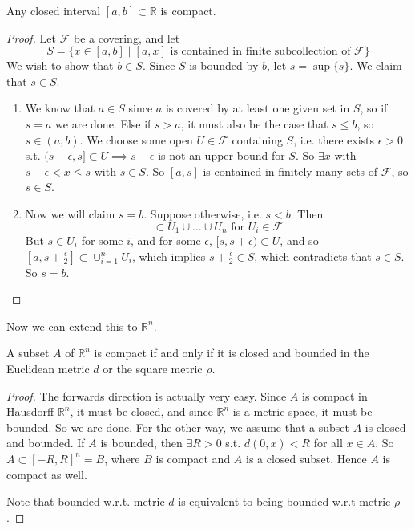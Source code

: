   \begin{lemma}
    Any closed interval $[a, b] \subset \mathbb{R}$ is compact. 
  \end{lemma} 
  \begin{proof}
    Let $\mathcal{F}$ be a covering, and let 
    \begin{equation}
      S = \{x \in [a, b] \mid [a, x] \text{ is contained in finite subcollection of } \mathcal{F} \}
    \end{equation}
    We wish to show that $b \in S$. Since $S$ is bounded by $b$, let $s = \sup\{s\}$. We claim that $s \in S$. 
    \begin{enumerate}
      \item We know that $a \in S$ since $a$ is covered by at least one given set in $S$, so if $s = a$ we are done. Else if $s > a$, it must also be the case that $s \leq b$, so $s \in (a, b)$. We choose some open $U \in \mathcal{F}$ containing $S$, i.e. there exists $\epsilon > 0$ s.t. $(s - \epsilon, s] \subset U \implies s - \epsilon$ is not an upper bound for $S$. So $\exists x$ with $s - \epsilon < x \leq s$ with $s \in S$. So $[a, s]$ is contained in finitely many sets of $\mathcal{F}$, so $s \in S$. 

      \item Now we will claim $s = b$. Suppose otherwise, i.e. $s < b$. Then 
      \begin{equation}
        [a, s] \subset U_1 \cup \ldots \cup U_n \text{ for } U_i \in \mathcal{F}
      \end{equation}
      But $s \in U_i$ for some $i$, and for some $\epsilon$, $[s, s + \epsilon) \subset U$, and so $[a, s + \frac{\epsilon}{2}] \subset \cup_{i=1}^{n} U_i$, which implies $s + \frac{\epsilon}{2} \in S$, which contradicts that $s \in S$. So $s = b$. 
    \end{enumerate}
  \end{proof}

  Now we can extend this to $\mathbb{R}^n$. 

  \begin{theorem}
    A subset $A$ of $\mathbb{R}^n$ is compact if and only if it is closed and bounded in the Euclidean metric $d$ or the square metric $\rho$. 
  \end{theorem}
  \begin{proof}
    The forwards direction is actually very easy. Since $A$ is compact in Hausdorff $\mathbb{R}^n$, it must be closed, and since $\mathbb{R}^n$ is a metric space, it must be bounded. So we are done. For the other way, we assume that a subset $A$ is closed and bounded. If $A$ is bounded, then $\exists R > 0$ s.t. $d(0, x) < R$ for all $x \in A$. So $A \subset [-R, R]^n = B$, where $B$ is compact and $A$ is a closed subset. Hence $A$ is compact as well. 

    Note that bounded w.r.t. metric $d$ is equivalent to being bounded w.r.t metric $\rho$. 
  \end{proof}

